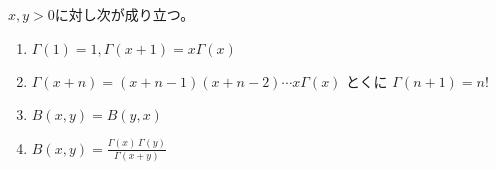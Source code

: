\documentclass[report]{jlreq}
\begin{document}
\begin{proposition}
    $x, y > 0$に対し次が成り立つ。
    \begin{enumerate}
        \item $\Gamma(1) = 1, \Gamma(x + 1) = x \Gamma(x)$
        \item $\Gamma(x + n) = (x + n - 1)(x + n - 2) \cdots x \Gamma(x)$
            \quad とくに \quad
            $\Gamma(n + 1) = n!$
        \item $B(x, y) = B(y, x)$ \vspace{0.5em}
        \item $B(x, y) = \frac{\Gamma(x)\, \Gamma(y)}{\Gamma(x + y)}$
    \end{enumerate}
\end{proposition}
\end{document}
